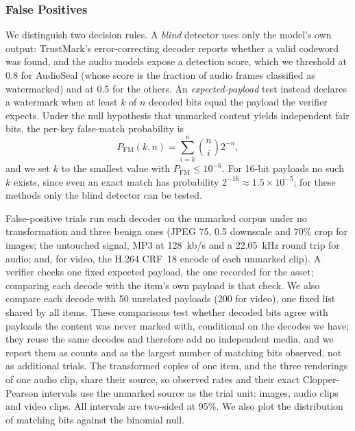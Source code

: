 \subsubsection{False Positives}
\label{sec:wm-fp-method}
We distinguish two decision rules. A \emph{blind} detector uses only the model's own output: TrustMark's error-correcting decoder reports whether a valid codeword was found, and the audio models expose a detection score, which we threshold at 0.8 for AudioSeal (whose score is the fraction of audio frames classified as watermarked) and at 0.5 for the others. An \emph{expected-payload} test instead declares a watermark when at least $k$ of $n$ decoded bits equal the payload the verifier expects. Under the null hypothesis that unmarked content yields independent fair bits, the per-key false-match probability is
\begin{equation}
P_{\mathrm{FM}}(k,n) = \sum_{i=k}^{n}\binom{n}{i}2^{-n},
\end{equation}
and we set $k$ to the smallest value with $P_{\mathrm{FM}}\le 10^{-6}$. For 16-bit payloads no such $k$ exists, since even an exact match has probability $2^{-16}\approx1.5\times10^{-5}$; for these methods only the blind detector can be tested.

False-positive trials run each decoder on the unmarked corpus under no transformation and three benign ones (JPEG 75, 0.5 downscale and 70\% crop for images; the untouched signal, MP3 at 128~kb/s and a 22.05~kHz round trip for audio; and, for video, the H.264 CRF~18 encode of each unmarked clip). A verifier checks one fixed expected payload, the one recorded for the asset; comparing each decode with the item's own payload is that check. We also compare each decode with 50 unrelated payloads (200 for video), one fixed list shared by all items. These comparisons test whether decoded bits agree with payloads the content was never marked with, conditional on the decodes we have; they reuse the same decodes and therefore add no independent media, and we report them as counts and as the largest number of matching bits observed, not as additional trials. The transformed copies of one item, and the three renderings of one audio clip, share their source, so observed rates and their exact Clopper-Pearson intervals \cite{clopper1934} use the unmarked source as the trial unit:  images,  audio clips and  video clips. All intervals are two-sided at 95\%. We also plot the distribution of matching bits against the binomial null.

